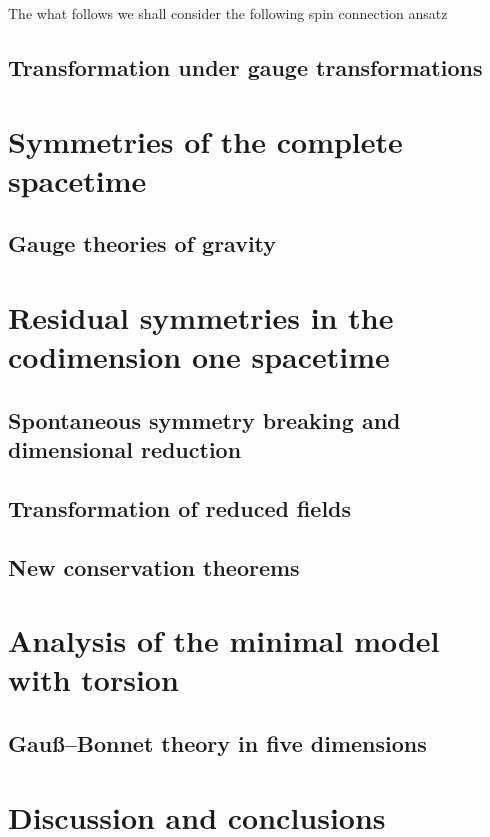 \documentclass[aps,prd,12pt,superscriptaddress,showpacs,showkeys,reprint]{revtex4-1}
\begin{document}
The what follows we shall consider the following spin connection ansatz

\subsection*{Transformation under gauge transformations}

\section{Symmetries of the complete spacetime}

\subsection*{Gauge theories of gravity}

\section{Residual symmetries in the codimension one spacetime}

\subsection*{Spontaneous symmetry breaking and dimensional reduction}

\subsection*{Transformation of reduced fields}

\subsection*{New conservation theorems}

\section{Analysis of the minimal model with torsion}

\subsection*{Gau\ss--Bonnet theory in five dimensions}

\section{Discussion and conclusions}
\end{document}
